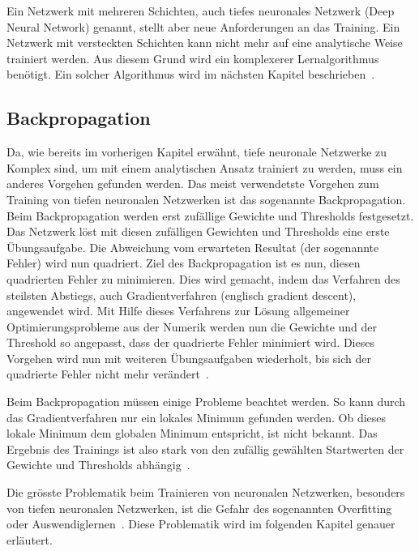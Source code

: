Ein Netzwerk mit mehreren Schichten, auch tiefes neuronales Netzwerk (Deep Neural Network) genannt, stellt aber neue Anforderungen an das Training. Ein Netzwerk mit versteckten Schichten kann nicht mehr auf eine analytische Weise trainiert werden. Aus diesem Grund wird ein komplexerer Lernalgorithmus benötigt. Ein solcher Algorithmus wird im nächsten Kapitel beschrieben~\autocite{Krogh2008}. 


\subsection{Backpropagation}
\label{chap:backpropagation}

Da, wie bereits im vorherigen Kapitel erwähnt, tiefe neuronale Netzwerke zu Komplex sind, um mit einem analytischen Ansatz trainiert zu werden, muss ein anderes Vorgehen gefunden werden. Das meist verwendetste Vorgehen zum Training von tiefen neuronalen Netzwerken ist das sogenannte Backpropagation. Beim Backpropagation werden erst zufällige Gewichte und Thresholds festgesetzt. Das Netzwerk löst mit diesen zufälligen Gewichten und Thresholds eine erste Übungsaufgabe. Die Abweichung vom erwarteten Resultat (der sogenannte Fehler) wird nun quadriert. Ziel des Backpropagation ist es nun, diesen quadrierten Fehler zu minimieren. Dies wird gemacht, indem das Verfahren des steilsten Abstiegs, auch Gradientverfahren (englisch gradient descent), angewendet wird. Mit Hilfe dieses Verfahrens zur Lösung allgemeiner Optimierungsprobleme aus der Numerik werden nun die Gewichte und der Threshold so angepasst, dass der quadrierte Fehler minimiert wird. Dieses Vorgehen wird nun mit weiteren Übungsaufgaben wiederholt, bis sich der quadrierte Fehler nicht mehr verändert~\autocite{Krogh2008}.

Beim Backpropagation müssen einige Probleme beachtet werden. So kann durch das Gradientverfahren nur ein lokales Minimum gefunden werden. Ob dieses lokale Minimum dem globalen Minimum entspricht, ist nicht bekannt. Das Ergebnis des Trainings ist also stark von den zufällig gewählten Startwerten der Gewichte und Thresholds abhängig~\autocite{Krogh2008}.

Die grösste Problematik beim Trainieren von neuronalen Netzwerken, besonders von tiefen neuronalen Netzwerken, ist die Gefahr des sogenannten Overfitting oder Auswendiglernen~\autocite{Krogh2008}. Diese Problematik wird im folgenden Kapitel genauer erläutert.


